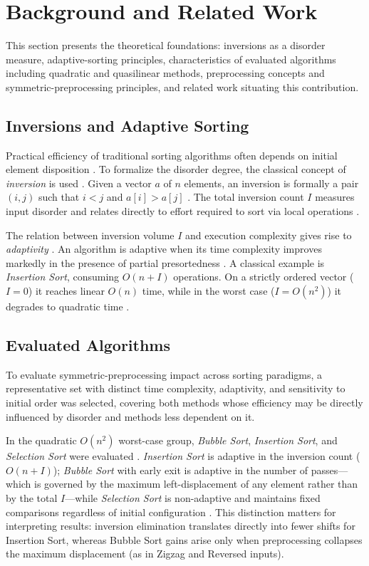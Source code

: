 \documentclass[namedate,webpdf,contemporary,large]{TBench-template}%
\theoremstyle{thmstyleone}%
\theoremstyle{thmstyletwo}%
\theoremstyle{thmstylethree}%
\begin{document}
\section{Background and Related Work}\label{sec:background}
This section presents the theoretical foundations: inversions as a disorder measure, adaptive-sorting principles, characteristics of evaluated algorithms including quadratic and quasilinear methods, preprocessing concepts and symmetric-preprocessing principles, and related work situating this contribution.

\subsection{Inversions and Adaptive Sorting}
Practical efficiency of traditional sorting algorithms often depends on initial element disposition \cite{cormen_introduction_2022,estivill-castro_survey_1992}. To formalize the disorder degree, the classical concept of \emph{inversion} is used \cite{knuth_art_1973}. Given a vector $a$ of $n$ elements, an inversion is formally a pair $(i,j)$ such that $i < j$ and $a[i] > a[j]$ \cite{knuth_art_1973,sedgewick_algorithms_2011}. The total inversion count $I$ measures input disorder and relates directly to effort required to sort via local operations \cite{mannila_measures_1984}.

The relation between inversion volume $I$ and execution complexity gives rise to \emph{adaptivity} \cite{estivill-castro_survey_1992}. An algorithm is adaptive when its time complexity improves markedly in the presence of partial presortedness \cite{mannila_measures_1984}. A classical example is \emph{Insertion Sort}, consuming $O(n+I)$ operations. On a strictly ordered vector ($I=0$) it reaches linear $O(n)$ time, while in the worst case ($I=O(n^2)$) it degrades to quadratic time \cite{cormen_introduction_2022,knuth_art_1973}.

\subsection{Evaluated Algorithms}
To evaluate symmetric-preprocessing impact across sorting paradigms, a representative set with distinct time complexity, adaptivity, and sensitivity to initial order was selected, covering both methods whose efficiency may be directly influenced by disorder and methods less dependent on it.

In the quadratic $O(n^2)$ worst-case group, \emph{Bubble Sort}, \emph{Insertion Sort}, and \emph{Selection Sort} were evaluated \cite{cormen_introduction_2022}. \emph{Insertion Sort} is adaptive in the inversion count ($O(n+I)$); \emph{Bubble Sort} with early exit is adaptive in the number of passes---which is governed by the maximum left-displacement of any element rather than by the total $I$---while \emph{Selection Sort} is non-adaptive and maintains fixed comparisons regardless of initial configuration \cite{estivill-castro_survey_1992}. This distinction matters for interpreting results: inversion elimination translates directly into fewer shifts for Insertion Sort, whereas Bubble Sort gains arise only when preprocessing collapses the maximum displacement (as in Zigzag and Reversed inputs).
\end{document}
